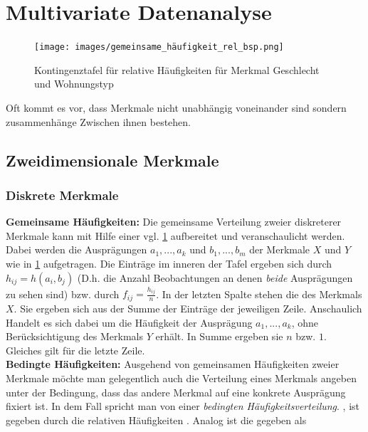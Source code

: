 \section{Multivariate Datenanalyse}
\begin{figure}
    \vspace{-5mm}
    \centering
    \texttt{[image: images/gemeinsame\_häufigkeit\_rel\_bsp.png]}
    \caption{Kontingenztafel für relative Häufigkeiten für Merkmal Geschlecht und Wohnungstyp}
    \label{fig:kontingenztafeln}
    \vspace{-9mm}
\end{figure}
Oft kommt es vor, dass Merkmale nicht unabhängig voneinander sind sondern zusammenhänge Zwischen ihnen bestehen.

\subsection{Zweidimensionale Merkmale}
\subsubsection{Diskrete Merkmale}
\textbf{Gemeinsame Häufigkeiten:} Die gemeinsame Verteilung zweier diskreterer Merkmale kann mit Hilfe einer  vgl. \cref{fig:kontingenztafeln} aufbereitet und veranschaulicht werden. Dabei werden die Ausprägungen $a_1, ..., a_k$ und $b_1, ..., b_m$ der Merkmale $X$ und $Y$ wie in \cref{fig:kontingenztafeln} aufgetragen. Die Einträge im inneren der Tafel ergeben sich durch $h_{ij} = h(a_i, b_j)$ (D.h. die Anzahl Beobachtungen an denen \emph{beide} Ausprägungen zu sehen sind) bzw. durch $f_{ij} = \frac{h_{ij}}{n}$. In der letzten Spalte stehen die  des Merkmals $X$. Sie ergeben sich aus der Summe der Einträge der jeweiligen Zeile. Anschaulich Handelt es sich dabei um die Häufigkeit der Ausprägung $a_1, ..., a_k$, ohne Berücksichtigung des Merkmals $Y$ erhält. In Summe ergeben sie $n$ bzw. $1$. Gleiches gilt für die letzte Zeile.\linebreak\\
\textbf{Bedingte Häufigkeiten:} Ausgehend von gemeinsamen Häufigkeiten zweier Merkmale möchte man gelegentlich auch die Verteilung eines Merkmals angeben unter der Bedingung, dass das andere Merkmal auf eine konkrete Ausprägung fixiert ist. In dem Fall spricht man von einer \emph{bedingten Häufigkeitsverteilung}.  , ist gegeben durch die relativen Häufigkeiten . Analog ist die  gegeben als 
